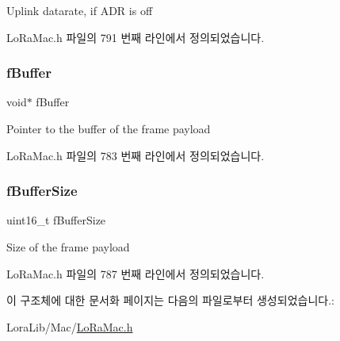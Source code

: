 Uplink datarate, if A\+DR is off 

Lo\+Ra\+Mac.\+h 파일의 791 번째 라인에서 정의되었습니다.

\mbox{\label{structs_mcps_req_proprietary_a2e9f11cf5a8f2a797999359bedee31af}} 
\subsubsection{\texorpdfstring{f\+Buffer}{fBuffer}}
{\footnotesize\ttfamily void$\ast$ f\+Buffer}

Pointer to the buffer of the frame payload 

Lo\+Ra\+Mac.\+h 파일의 783 번째 라인에서 정의되었습니다.

\mbox{\label{structs_mcps_req_proprietary_a6b4fc83528d7391a193516d9f4ba985b}} 
\subsubsection{\texorpdfstring{f\+Buffer\+Size}{fBufferSize}}
{\footnotesize\ttfamily uint16\+\_\+t f\+Buffer\+Size}

Size of the frame payload 

Lo\+Ra\+Mac.\+h 파일의 787 번째 라인에서 정의되었습니다.



이 구조체에 대한 문서화 페이지는 다음의 파일로부터 생성되었습니다.\+:\begin{DoxyCompactItemize}
\item 
Lora\+Lib/\+Mac/\mbox{\hyperlink{_lo_ra_mac_8h}{Lo\+Ra\+Mac.\+h}}\end{DoxyCompactItemize}
